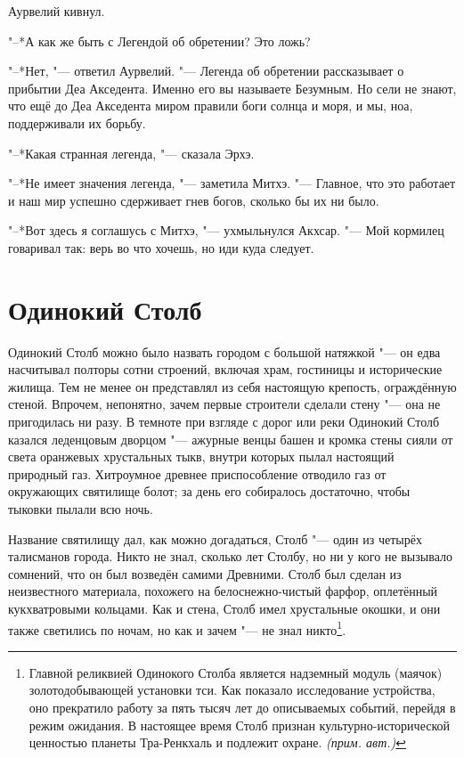 \documentclass[a4paper,10pt]{book}
\newcommand{\authornote}{\textit{(прим. авт.)}}
\begin{document}
Аурвелий кивнул.

"--*А как же быть с Легендой об обретении? Это ложь?

"--*Нет, "--- ответил Аурвелий. "--- Легенда об обретении рассказывает о 
прибытии Деа Акседента. Именно его вы называете Безумным. Но сели не знают, что 
ещё до Деа Акседента миром правили боги солнца и моря, и мы, ноа, поддерживали 
их борьбу.

"--*Какая странная легенда, "--- сказала Эрхэ.

"--*Не имеет значения легенда, "--- заметила Митхэ. "--- Главное, что это 
работает и наш мир успешно сдерживает гнев богов, сколько бы их ни было.

"--*Вот здесь я соглашусь с Митхэ, "--- ухмыльнулся Акхсар. "--- Мой кормилец 
говаривал так: верь во что хочешь, но иди куда следует.

\section{Одинокий Столб}

Одинокий Столб можно было назвать городом с большой натяжкой "--- он едва насчитывал полторы сотни строений, включая храм, гостиницы и исторические жилища.
Тем не менее он представлял из себя настоящую крепость, ограждённую стеной.
Впрочем, непонятно, зачем первые строители сделали стену "--- она не пригодилась ни разу.
В темноте при взгляде с дорог или реки Одинокий Столб казался леденцовым дворцом "--- ажурные венцы башен и кромка стены сияли от света оранжевых хрустальных тыкв, внутри которых пылал настоящий природный газ.
Хитроумное древнее приспособление отводило газ от окружающих святилище болот;
за день его собиралось достаточно, чтобы тыковки пылали всю ночь. 

Название святилищу дал, как можно догадаться, Столб "--- один из четырёх талисманов города.
Никто не знал, сколько лет Столбу, но ни у кого не вызывало сомнений, что он был возведён самими Древними.
Столб был сделан из неизвестного материала, похожего на белоснежно-чистый фарфор, оплетённый кукхватровыми кольцами.
Как и стена, Столб имел хрустальные окошки, и они также светились по ночам, но как и зачем "--- не знал никто\footnote{Главной реликвией Одинокого Столба является надземный модуль (маячок) золотодобывающей установки тси. Как показало исследование устройства, оно прекратило работу за пять тысяч лет до описываемых событий, перейдя в режим ожидания. В настоящее время Столб признан культурно-исторической ценностью планеты Тра-Ренкхаль и подлежит охране. \authornote}.
\end{document}
